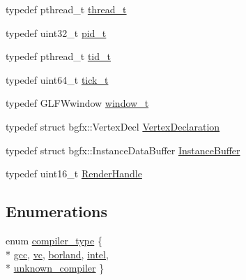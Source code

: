 \begin{DoxyCompactItemize}
\item 
typedef pthread\+\_\+t \hyperlink{namespacecrap_acd6ada6ce68b7a664e02cc09a05cdeb3}{thread\+\_\+t}
\item 
typedef uint32\+\_\+t \hyperlink{namespacecrap_a16bdcfd808340c5c364a5c78bbb1f39a}{pid\+\_\+t}
\item 
typedef pthread\+\_\+t \hyperlink{namespacecrap_ac21fdaa6d61c6dfcc98ddbb9fd7566ca}{tid\+\_\+t}
\item 
typedef uint64\+\_\+t \hyperlink{namespacecrap_ad017b1c2078d1f4d59557eda5d95b149}{tick\+\_\+t}
\item 
typedef G\+L\+F\+Wwindow \hyperlink{namespacecrap_a3917356677c911215fe8f50465f335bf}{window\+\_\+t}
\item 
typedef struct bgfx\+::\+Vertex\+Decl \hyperlink{namespacecrap_a5054f00dc3a0c41f32137cf2233a72eb}{Vertex\+Declaration}
\item 
typedef struct bgfx\+::\+Instance\+Data\+Buffer \hyperlink{namespacecrap_a1fd4f73d2fea6a3c7aa7624b9d7d68b8}{Instance\+Buffer}
\item 
typedef uint16\+\_\+t \hyperlink{namespacecrap_abc80287e8f903e84b76fec4c44671533}{Render\+Handle}
\end{DoxyCompactItemize}
\subsection*{Enumerations}
\begin{DoxyCompactItemize}
\item 
enum \hyperlink{namespacecrap_a1118686d0b1bada904e097ebb2799067}{compiler\+\_\+type} \{ \\*
\hyperlink{namespacecrap_a1118686d0b1bada904e097ebb2799067a622d828c592f48409bcab1c21220d317}{gcc}, 
\hyperlink{namespacecrap_a1118686d0b1bada904e097ebb2799067a78c36762f3b9c3455946cf3e3021879d}{vc}, 
\hyperlink{namespacecrap_a1118686d0b1bada904e097ebb2799067aba75e81d00209e8acc8aa3b616a24beb}{borland}, 
\hyperlink{namespacecrap_a1118686d0b1bada904e097ebb2799067a5eccccfad078ff77b5d6a625768aed79}{intel}, 
\\*
\hyperlink{namespacecrap_a1118686d0b1bada904e097ebb2799067acc56888524d023c251551fc013114194}{unknown\+\_\+compiler}
 \}
\end{DoxyCompactItemize}
